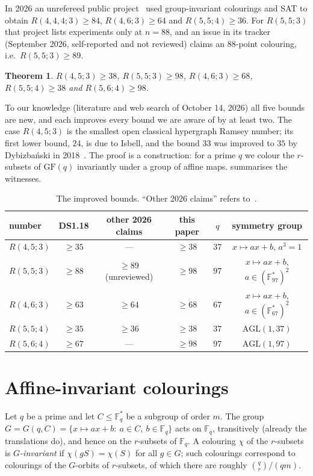 \documentclass[11pt]{article}
\newtheorem{theorem}{Theorem}[section]
\theoremstyle{definition}
\theoremstyle{remark}
\newcommand{\F}{\mathbb F}
\newcommand{\GF}{\mathrm{GF}}
\newcommand{\AGL}{\mathrm{AGL}}
\newcommand{\RFSF}{98}
\newcommand{\RFSFq}{97}
\newcommand{\RFSFgroup}{$\AGL(1,97)$}
\begin{document}
In 2026 an unrefereed public project~\cite{SV} used group-invariant colourings and SAT to obtain
$R(4,4,4;3)\ge 84$, $R(4,6;3)\ge 64$ and $R(5,5;4)\ge 36$. For $R(5,5;3)$ that project lists experiments
only at $n=88$, and an issue in its tracker (September 2026, self-reported and not reviewed) claims an
$88$-point colouring, i.e.\ $R(5,5;3)\ge 89$.

\begin{theorem}\label{thm:main}
$R(4,5;3)\ge 38$, $R(5,5;3)\ge 98$, $R(4,6;3)\ge 68$, $R(5,5;4)\ge 38$ and $R(5,6;4)\ge \RFSF$.
\end{theorem}

To our knowledge (literature and web search of October 14, 2026) all five bounds are new, and each improves
every bound we are aware of by at least two. The case $R(4,5;3)$ is the smallest open classical hypergraph
Ramsey number; its first lower bound, $24$, is due to Isbell, and the bound $33$ was improved to $35$ by
Dybizbański in 2018~\cite{Dyb2,DS1}. The proof is a construction: for a prime $q$ we colour
the $r$-subsets of $\GF(q)$ invariantly under a group of affine maps.  summarises
the witnesses.

\begin{table}[h]
\centering
\begin{tabular}{lccccc}
\toprule
number & DS1.18 & other 2026 claims & this paper & $q$ & symmetry group\\
\midrule
$R(4,5;3)$ & $\ge 35$ & --- & $\ge 38$ & $37$ & $x\mapsto ax+b$, $a^3=1$\\
$R(5,5;3)$ & $\ge 88$ & $\ge 89$ (unreviewed) & $\ge 98$ & $97$ & $x\mapsto ax+b$, $a\in(\F_{97}^{*})^{2}$\\
$R(4,6;3)$ & $\ge 63$ & $\ge 64$ & $\ge 68$ & $67$ & $x\mapsto ax+b$, $a\in(\F_{67}^{*})^{2}$\\
$R(5,5;4)$ & $\ge 35$ & $\ge 36$ & $\ge 38$ & $37$ & $\AGL(1,37)$\\
$R(5,6;4)$ & $\ge 67$ & --- & $\ge \RFSF$ & $\RFSFq$ & \RFSFgroup\\
\bottomrule
\end{tabular}
\caption{The improved bounds. ``Other 2026 claims'' refers to~\cite{SV}.}
\label{tab:results}
\end{table}

\section{Affine-invariant colourings}

Let $q$ be a prime and let $C\le \F_q^{*}$ be a subgroup of order $m$. The group
$G=G(q,C)=\{x\mapsto ax+b:\ a\in C,\ b\in\F_q\}$ acts on $\F_q$, transitively (already the translations
do), and hence on the $r$-subsets of $\F_q$. A colouring $\chi$ of the $r$-subsets is \emph{$G$-invariant}
if $\chi(gS)=\chi(S)$ for all $g\in G$; such colourings correspond to colourings of the $G$-orbits of
$r$-subsets, of which there are roughly $\binom{q}{r}/(qm)$.
\end{document}
